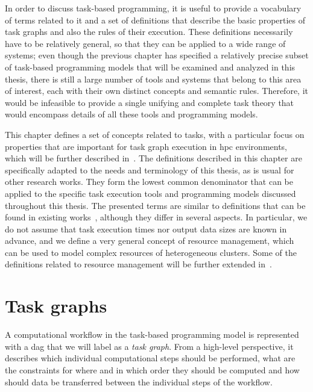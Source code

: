 In order to discuss task-based programming, it is useful to provide a vocabulary of terms related
to it and a set of definitions that describe the basic properties of task graphs and also the rules
of their execution. These definitions necessarily have to be relatively general, so that they can be applied
to a wide range of systems; even though the previous chapter has specified a relatively precise subset of
task-based programming models that will be examined and analyzed in this thesis, there is still a
large number of tools and systems that belong to this area of interest, each with their own
distinct concepts and semantic rules. Therefore, it would be infeasible to provide a single unifying and
complete task theory that would encompass details of all these tools and programming models.

This chapter defines a set of concepts related to tasks, with a particular focus on properties that
are important for task graph execution in \gls{hpc} environments, which will be
further described in~. The definitions described in this chapter are
specifically adapted to the needs and terminology of this thesis, as is usual for other research
works. They form the lowest common denominator that can be applied to the specific task execution
tools and programming models discussed throughout this thesis. The presented terms are
similar to definitions that can be found in existing works~\cite{task_scheduling,hagras2003static,wang2018list}, although they
differ in several aspects. In particular, we do not assume that task execution times nor output
data sizes are known in advance, and we define a very general concept of resource management, which
can be used to model complex resources of heterogeneous clusters. Some of the definitions related
to resource management will be further extended in~.

\section{Task graphs}
\label{sec:task-graphs}
A computational workflow in the task-based programming model is represented with a
\gls{dag} that we will label as a \emph{task graph}. From a high-level
perspective, it describes which individual computational steps should be performed, what are the
constraints for where and in which order they should be computed and how should data be transferred
between the individual steps of the workflow.

